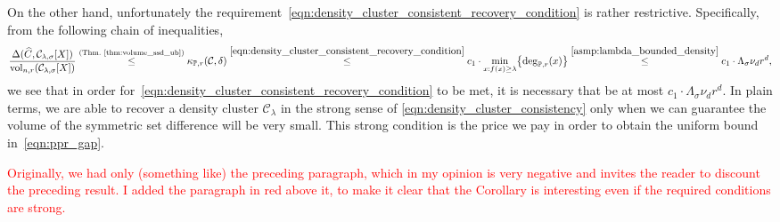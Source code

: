 \documentclass[11pt,twoside]{article}
\newcommand{\1}{\mathbf{1}}
\newcommand{\mc}[1]{\mathcal{#1}}
\newcommand{\Pbb}{\mathbb{P}}
\newcommand{\wh}[1]{\widehat{#1}}
\newcommand{\vol}{\mathrm{vol}}
\begin{document}
On the other hand, unfortunately the requirement~\eqref{eqn:density_cluster_consistent_recovery_condition} is rather restrictive. Specifically, from the following chain of inequalities,
\begin{equation*}
\frac{\Delta(\wh{C}, \mc{C}_{\lambda,\sigma}[X])}{\vol_{n,r}(\mc{C}_{\lambda,\sigma}[X])} \overset{(\textrm{Thm.~\ref{thm:volume_ssd_ub}})}{\leq} \kappa_{\Pbb,r}(\mc{C},\delta) \overset{\eqref{eqn:density_cluster_consistent_recovery_condition}}{\leq} c_1 \cdot \min_{x: f(x) \geq \lambda} \bigl\{\deg_{\Pbb,r}(x)\bigr\} \overset{\ref{asmp:lambda_bounded_density}}{\leq} c_1 \cdot \Lambda_{\sigma} \nu_d r^d,
\end{equation*}
we see that in order for~\eqref{eqn:density_cluster_consistent_recovery_condition} to be met, it is necessary that \smash{$\Delta(\wh{C}, \mc{C}_{\lambda,\sigma}[X])/\vol_{n,r}(\mc{C}_{\lambda,\sigma}[X])$} be at most $c_1 \cdot \Lambda_{\sigma} \nu_d r^d$. In plain terms, we 
are able to recover a density cluster $\mc{C}_{\lambda}$ in the strong sense of
\eqref{eqn:density_cluster_consistency} only when we can guarantee the volume of the symmetric set difference will be very small. This strong condition is
the price we pay in order to obtain the uniform bound in~\eqref{eqn:ppr_gap}.\vspace{1 mm}

\textcolor{red}{Originally, we had only (something like) the preceding paragraph, which in my opinion is very negative and invites the reader to discount the preceding result. I added the paragraph in red above it, to make it clear that the Corollary is interesting even if the required conditions are strong.}
\end{document}
